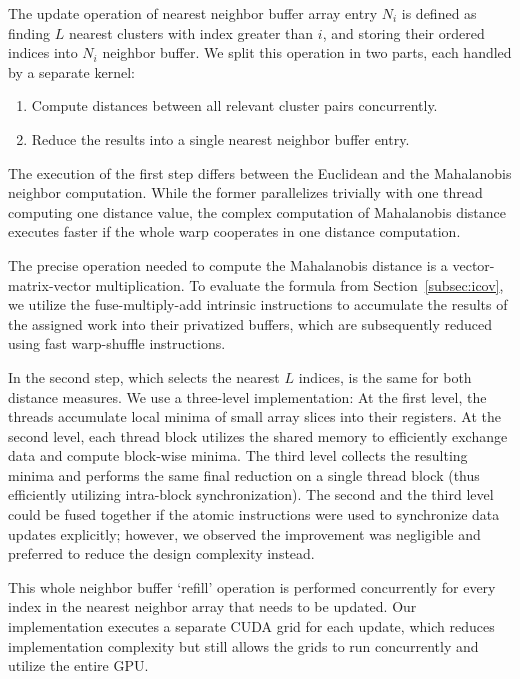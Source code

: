 The update operation of nearest neighbor buffer array entry $N_i$ is defined as finding $L$ nearest clusters with index greater than $i$, and storing their ordered indices into $N_i$ neighbor buffer.
We split this operation in two parts, each handled by a separate kernel:
\begin{enumerate}
	\item Compute distances between all relevant cluster pairs concurrently.
	\item Reduce the results into a single nearest neighbor buffer entry.
\end{enumerate}

The execution of the first step differs between the Euclidean and the Mahalanobis neighbor computation.
While the former parallelizes trivially with one thread computing one distance value, the complex computation of Mahalanobis distance executes faster if the whole warp cooperates in one distance computation.

The precise operation needed to compute the Mahalanobis distance is a vector-matrix-vector multiplication.
To evaluate the formula from Section~\ref{subsec:icov}, we utilize the fuse-multiply-add intrinsic instructions to accumulate the results of the assigned work into their privatized buffers, which are subsequently reduced using fast warp-shuffle instructions.

In the second step, which selects the nearest $L$ indices, is the same for both distance measures.
We use a three-level implementation:
At the first level, the threads accumulate local minima of small array slices into their registers.
At the second level, each thread block utilizes the shared memory to efficiently exchange data and compute block-wise minima.
The third level collects the resulting minima and performs the same final reduction on a single thread block (thus efficiently utilizing intra-block synchronization).
The second and the third level could be fused together if the atomic instructions were used to synchronize data updates explicitly; however, we observed the improvement was negligible and preferred to reduce the design complexity instead.

This whole neighbor buffer `refill' operation is performed concurrently for every index in the nearest neighbor array that needs to be updated.
Our implementation executes a separate CUDA grid for each update, which reduces implementation complexity but still allows the grids to run concurrently and utilize the entire GPU.


